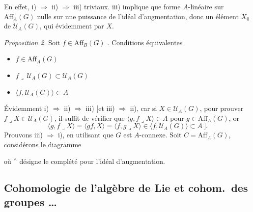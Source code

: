 \documentclass[11pt,a4paper]{article}
\begin{document}
En effet, i) $\Rightarrow$ ii) $\Rightarrow$ iii)  triviaux. iii) implique que 
  forme $A$-linéaire sur
$\mathrm{Aff}_A(G)$ nulle sur une puissance de l'idéal d'augmentation,
donc un élément $X_0$ de $\mathcal{U}_A(G)$, qui 
évidemment  par $X$.


\emph{Proposition 2}. Soit $f \in \mathrm{Aff}_B(G)$
. Conditions équivalentes
\begin{itemize}
  \item[i)] $f \in \mathrm{Aff}_A(G)$
  \item[ii)] $f \lrcorner\, \mathcal{U}_A(G) \subset \mathcal{U}_A(G)$
  \item[iii)] $\langle f, \mathcal{U}_A(G) \rangle \subset A$
\end{itemize}

Évidemment i) $\Rightarrow$ ii) $\Rightarrow$ iii) [et iii) $\Rightarrow$
ii), car \struck{\ill{}} si $X \in \mathcal{U}_A(G)$, pour
prouver $f \lrcorner X \in \mathcal{U}_A(G)$, il suffit  de
vérifier que $\langle g, f \lrcorner X \rangle \in A$ pour
$g \in \mathrm{Aff}_A(G)$, or
\[
\langle g, f \lrcorner X \rangle = \langle gf, X \rangle
= \langle f, g \lrcorner X \rangle \in \langle f, \mathcal{U}_A(G) \rangle
\subset A \ ].
\]
Prouvons iii) $\Rightarrow$ i), en utilisant que $G$ est $A$-connexe.
Soit $C = \mathrm{Aff}_A(G)$, considérons le diagramme


où ${}^\wedge$ désigne le  complété pour l'idéal
d'augmentation.

\subsection*{Cohomologie de l'algèbre de Lie et cohom.\ des groupes \ldots}
\end{document}
